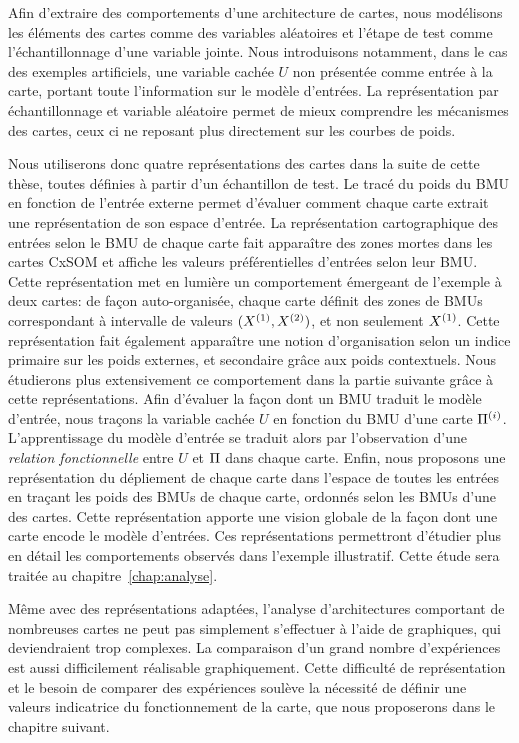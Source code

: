 \documentclass[../main]{subfiles}
\begin{document}
Afin d'extraire des comportements d'une architecture de cartes, nous modélisons les éléments des cartes comme des variables aléatoires et l'étape de test comme l'échantillonnage d'une variable jointe. Nous introduisons notamment, dans le cas des exemples artificiels, une variable cachée $U$ non présentée comme entrée à la carte, portant toute l'information sur le modèle d'entrées.
La représentation par échantillonnage et variable aléatoire permet de mieux comprendre les mécanismes des cartes, ceux ci ne reposant plus directement sur les courbes de poids.

Nous utiliserons donc quatre représentations des cartes dans la suite de cette thèse, toutes définies à partir d'un échantillon de test.
Le tracé du poids du BMU en fonction de l'entrée externe permet d'évaluer comment chaque carte extrait une représentation de son espace d'entrée.
La représentation cartographique des entrées selon le BMU de chaque carte fait apparaître des zones mortes dans les cartes CxSOM et affiche les valeurs préférentielles d'entrées selon leur BMU. Cette représentation met en lumière un comportement émergeant de l'exemple à deux cartes: de façon auto-organisée, chaque carte définit des zones de BMUs correspondant à intervalle de valeurs $(X^{({1})},X^{({2})})$, et non seulement $X^{({1})}$. Cette représentation fait également apparaître une notion d'organisation selon un indice primaire sur les poids externes, et secondaire grâce aux poids contextuels. Nous étudierons plus extensivement ce comportement dans la partie suivante grâce à cette représentations.
Afin d'évaluer la façon dont un BMU traduit le modèle d'entrée, nous traçons la variable cachée $U$ en fonction du BMU d'une carte $\Pi^{({i})}$.
L'apprentissage du modèle d'entrée se traduit alors par l'observation d'une \emph{relation fonctionnelle} entre $U$ et $\Pi$ dans chaque carte.
Enfin, nous proposons une représentation du dépliement de chaque carte dans l'espace de toutes les entrées en traçant les poids des BMUs de chaque carte, ordonnés selon les BMUs d'une des cartes. Cette représentation apporte une vision globale de la façon dont une carte encode le modèle d'entrées.
Ces représentations permettront d'étudier plus en détail les comportements observés dans l'exemple illustratif. Cette étude sera traitée au chapitre~\ref{chap:analyse}.

Même avec des représentations adaptées, l'analyse d'architectures comportant de nombreuses cartes ne peut pas simplement s'effectuer à l'aide de graphiques, qui deviendraient trop complexes. La comparaison d'un grand nombre d'expériences est aussi difficilement réalisable graphiquement.
Cette difficulté de représentation et le besoin de comparer des expériences soulève la nécessité de définir une valeurs indicatrice du fonctionnement de la carte, que nous proposerons dans le chapitre suivant.
\end{document}
